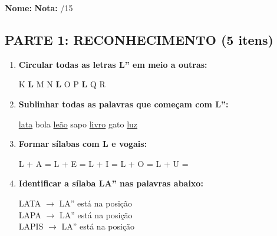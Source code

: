 \begin{exercicio}

\noindent\textbf{Nome:} \underline{\hspace{4cm}} \quad \textbf{Nota:} \underline{\hspace{1cm}}/15

\subsection*{PARTE 1: RECONHECIMENTO (5 itens)}

\begin{enumerate}
  \item \textbf{Circular todas as letras L'' em meio a outras:}
  \begin{center}
  K \quad \textbf{L} \quad M \quad N \quad \textbf{L} \quad O \quad P \quad \textbf{L} \quad Q \quad R
  \end{center}

  \item \textbf{Sublinhar todas as palavras que começam com L'':}
  \begin{center}
  \uline{lata} \quad bola \quad \uline{leão} \quad sapo \quad \uline{livro} \quad gato \quad \uline{luz}
  \end{center}

  \item \textbf{Formar sílabas com L e vogais:}
  \begin{center}
  L + A = \underline{\hspace{1.5cm}} \quad L + E = \underline{\hspace{1.5cm}} \quad L + I = \underline{\hspace{1.5cm}} \quad L + O = \underline{\hspace{1.5cm}} \quad L + U = \underline{\hspace{1.5cm}}
  \end{center}

  \item \textbf{Identificar a sílaba LA'' nas palavras abaixo:}
  \begin{center}
  LATA $\rightarrow$ LA'' está na posição \underline{\hspace{1cm}} \\
  LAPA $\rightarrow$ LA'' está na posição \underline{\hspace{1cm}} \\
  LAPIS $\rightarrow$ LA'' está na posição \underline{\hspace{1cm}}
  \end{center}


\end{enumerate}
\end{exercicio}

